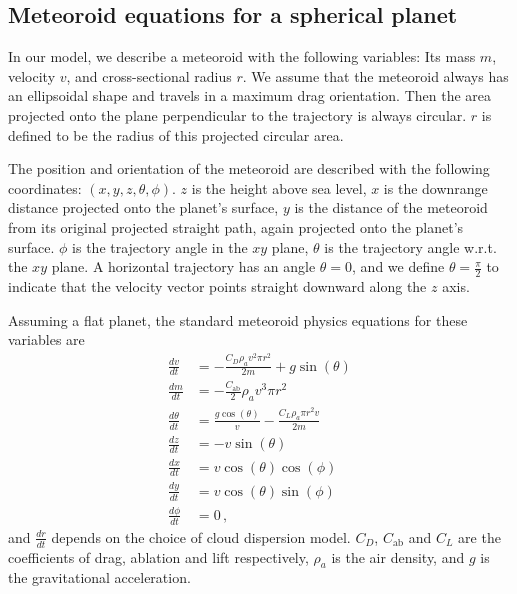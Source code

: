 \subsection{Meteoroid equations for a spherical planet}

In our model, we describe a meteoroid with the following variables: Its mass $m$, velocity $v$, and cross-sectional radius $r$. We assume that the meteoroid always has an ellipsoidal shape and travels in a maximum drag orientation. Then the area projected onto the plane perpendicular to the trajectory is always circular. $r$ is defined to be the radius of this projected circular area.

The position and orientation of the meteoroid are described with the following coordinates: $(x, y, z, \theta, \phi)$. $z$ is the height above sea level, $x$ is the downrange distance projected onto the planet's surface, $y$ is the distance of the meteoroid from its original projected straight path, again projected onto the planet's surface. $\phi$ is the trajectory angle in the $xy$ plane, $\theta$ is the trajectory angle w.r.t. the $xy$ plane. A horizontal trajectory has an angle $\theta = 0$, and we define $\theta = \frac{\pi}{2}$ to indicate that the velocity vector points straight downward along the $z$ axis.

Assuming a flat planet, the standard meteoroid physics equations \citep[e.g.][]{passey1980effects} for these variables are
\begin{align}
    \frac{dv}{dt} &= -\frac{C_D \rho_a v^2 \pi r^2}{2m} + g\sin(\theta)\\
    \frac{dm}{dt} &= -\frac{C_\mathrm{ab}}{2}\rho_a v^3 \pi r^2 \\
    \frac{d\theta}{dt} &= \frac{g\cos(\theta)}{v} - \frac{C_L \rho_a \pi r^2 v}{2m} \\
    \frac{dz}{dt} &= -v\sin(\theta) \\
    \frac{dx}{dt} &= v\cos(\theta)\cos(\phi) \\
    \frac{dy}{dt} &= v\cos(\theta)\sin(\phi) \\
    \frac{d\phi}{dt} &= 0\,,
\end{align}
and $\frac{dr}{dt}$ depends on the choice of cloud dispersion model. $C_D$, $C_\mathrm{ab}$ and $C_L$ are the coefficients of drag, ablation and lift respectively, $\rho_a$ is the air density, and $g$ is the gravitational acceleration.

